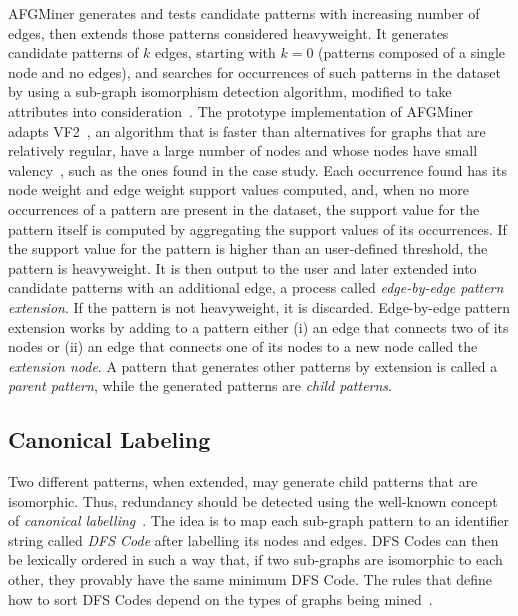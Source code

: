 AFGMiner generates and tests candidate patterns with increasing number of edges, then extends those patterns considered heavyweight. It generates candidate patterns of $k$ edges, starting with $k = 0$ (patterns composed of a single node and no edges), and searches for occurrences of such patterns in the dataset by using a sub-graph isomorphism detection algorithm, modified to take attributes into consideration~\cite{GomesMSc12}. The prototype implementation of AFGMiner adapts VF2~\cite{Cordella}, an algorithm that is faster than alternatives for graphs that are relatively regular, have a large number of nodes and whose nodes have small valency~\cite{Foggia}, such as the ones found in the case study. Each occurrence found has its node weight and edge weight support values computed, and, when no more occurrences of a pattern are present in the dataset, the support value for the pattern itself is computed by aggregating the support values of its occurrences. If the support value for the pattern is higher than an user-defined threshold, the pattern is heavyweight. It is then output to the user and later extended into candidate patterns with an additional edge, a process called \emph{edge-by-edge pattern extension}. If the pattern is not heavyweight, it is discarded. Edge-by-edge pattern extension works by adding to a pattern either (i) an edge that connects two of its nodes or (ii) an edge that connects one of its nodes to a new node called the \emph{extension node}. A pattern that generates other patterns by extension is called a \emph{parent pattern}, while the generated patterns are \emph{child patterns}.

\subsection{Canonical Labeling}
Two different patterns, when extended, may generate child patterns that are isomorphic. Thus, redundancy should be detected using the well-known concept of \emph{canonical labelling}~\cite{gSpan}. The idea is to map each sub-graph pattern to an identifier string called \emph{DFS Code} after labelling its nodes and edges. DFS Codes can then be lexically ordered in such a way that, if two sub-graphs are isomorphic to each other, they provably have the same minimum DFS Code. The rules that define how to sort DFS Codes depend on the types of graphs being mined~\cite{GomesMSc12}.

